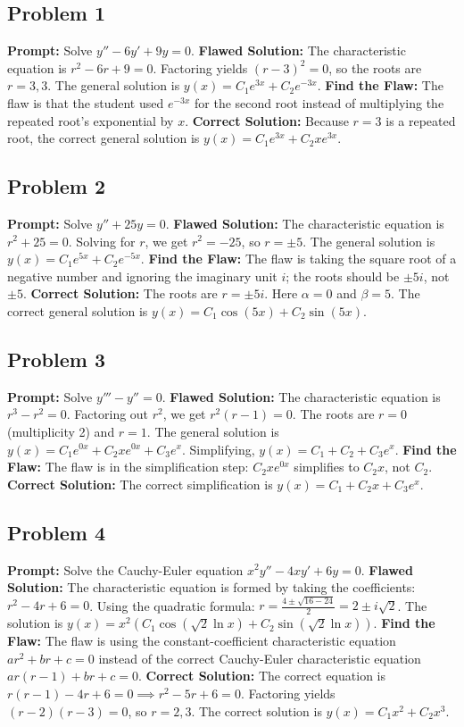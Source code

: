 \documentclass[11pt]{article}
\begin{document}
\subsection{Problem 1}
\textbf{Prompt:} Solve $y'' - 6y' + 9y = 0$.
\textbf{Flawed Solution:}
The characteristic equation is $r^2 - 6r + 9 = 0$.
Factoring yields $(r - 3)^2 = 0$, so the roots are $r = 3, 3$.
The general solution is $y(x) = C_1 e^{3x} + C_2 e^{-3x}$.
\textbf{Find the Flaw:}
The flaw is that the student used $e^{-3x}$ for the second root instead of multiplying the repeated root's exponential by $x$.
\textbf{Correct Solution:}
Because $r=3$ is a repeated root, the correct general solution is $y(x) = C_1 e^{3x} + C_2 x e^{3x}$.

\subsection{Problem 2}
\textbf{Prompt:} Solve $y'' + 25y = 0$.
\textbf{Flawed Solution:}
The characteristic equation is $r^2 + 25 = 0$.
Solving for $r$, we get $r^2 = -25$, so $r = \pm 5$.
The general solution is $y(x) = C_1 e^{5x} + C_2 e^{-5x}$.
\textbf{Find the Flaw:}
The flaw is taking the square root of a negative number and ignoring the imaginary unit $i$; the roots should be $\pm 5i$, not $\pm 5$.
\textbf{Correct Solution:}
The roots are $r = \pm 5i$. Here $\alpha = 0$ and $\beta = 5$. The correct general solution is $y(x) = C_1 \cos(5x) + C_2 \sin(5x)$.

\subsection{Problem 3}
\textbf{Prompt:} Solve $y''' - y'' = 0$.
\textbf{Flawed Solution:}
The characteristic equation is $r^3 - r^2 = 0$.
Factoring out $r^2$, we get $r^2(r - 1) = 0$.
The roots are $r = 0$ (multiplicity 2) and $r = 1$.
The general solution is $y(x) = C_1 e^{0x} + C_2 x e^{0x} + C_3 e^x$.
Simplifying, $y(x) = C_1 + C_2 + C_3 e^x$.
\textbf{Find the Flaw:}
The flaw is in the simplification step: $C_2 x e^{0x}$ simplifies to $C_2 x$, not $C_2$.
\textbf{Correct Solution:}
The correct simplification is $y(x) = C_1 + C_2 x + C_3 e^x$.

\subsection{Problem 4}
\textbf{Prompt:} Solve the Cauchy-Euler equation $x^2 y'' - 4x y' + 6y = 0$.
\textbf{Flawed Solution:}
The characteristic equation is formed by taking the coefficients: $r^2 - 4r + 6 = 0$.
Using the quadratic formula: $r = \frac{4 \pm \sqrt{16 - 24}}{2} = 2 \pm i\sqrt{2}$.
The solution is $y(x) = x^2 (C_1 \cos(\sqrt{2} \ln x) + C_2 \sin(\sqrt{2} \ln x))$.
\textbf{Find the Flaw:}
The flaw is using the constant-coefficient characteristic equation $a r^2 + b r + c = 0$ instead of the correct Cauchy-Euler characteristic equation $a r(r-1) + b r + c = 0$.
\textbf{Correct Solution:}
The correct equation is $r(r-1) - 4r + 6 = 0 \implies r^2 - 5r + 6 = 0$.
Factoring yields $(r - 2)(r - 3) = 0$, so $r = 2, 3$.
The correct solution is $y(x) = C_1 x^2 + C_2 x^3$.
\end{document}
